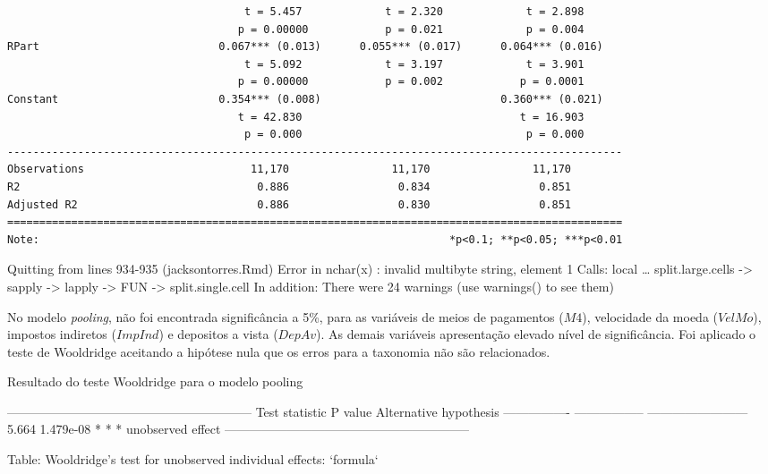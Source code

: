 \documentclass[12pt,12pt,openright,oneside,a4paper,chapter=TITLE,section=TITLE,subsection=TITLE,subsubsection=TITLE,english,french,spanish,portugues,sumario=tradicional]{abntex2}
\begin{document}
\begin{verbatim}
                                     t = 5.457             t = 2.320             t = 2.898      
                                    p = 0.00000            p = 0.021             p = 0.004      
RPart                            0.067*** (0.013)      0.055*** (0.017)      0.064*** (0.016)   
                                     t = 5.092             t = 3.197             t = 3.901      
                                    p = 0.00000            p = 0.002            p = 0.0001      
Constant                         0.354*** (0.008)                            0.360*** (0.021)   
                                    t = 42.830                                  t = 16.903      
                                     p = 0.000                                   p = 0.000      
------------------------------------------------------------------------------------------------
Observations                          11,170                11,170                11,170        
R2                                     0.886                 0.834                 0.851        
Adjusted R2                            0.886                 0.830                 0.851        
================================================================================================
Note:                                                                *p<0.1; **p<0.05; ***p<0.01
\end{verbatim}

Quitting from lines 934-935 (jacksontorres.Rmd)
Error in nchar(x) : invalid multibyte string, element 1
Calls: local \ldots{} split.large.cells -\textgreater{} sapply -\textgreater{} lapply -\textgreater{} FUN -\textgreater{} split.single.cell
In addition: There were 24 warnings (use warnings() to see them)

No modelo \emph{pooling}, não foi encontrada significância a 5\%, para as variáveis de meios de pagamentos (\(M4\)), velocidade da moeda (\(VelMo\)), impostos indiretos (\(ImpInd\)) e depositos a vista (\(DepAv\)). As demais variáveis apresentação elevado nível de significância. Foi aplicado o teste de Wooldridge aceitando a hipótese nula que os erros para a taxonomia não são relacionados.

\begin{table}
\caption{Resultado do teste Wooldridge para o modelo pooling}
\vspace{-2mm}

-----------------------------------------------------------
 Test statistic       P value       Alternative hypothesis 
---------------- ----------------- ------------------------
     5.664        1.479e-08 * * *     unobserved effect    
-----------------------------------------------------------

Table: Wooldridge's test for unobserved individual effects: `formula`
\vspace{1mm}
\label{tb:wdtest}
\vspace{-2mm}
\end{table}
\end{document}
